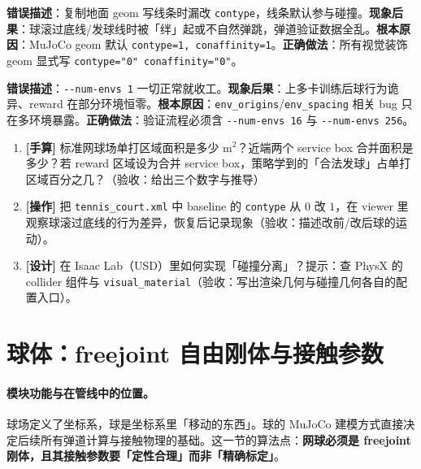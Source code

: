 \begin{pitfall}
\textbf{错误描述}：复制地面 geom 写线条时漏改 \verb|contype|，线条默认参与碰撞。\textbf{现象后果}：球滚过底线/发球线时被「绊」起或不自然弹跳，弹道验证数据全乱。\textbf{根本原因}：MuJoCo geom 默认 \verb|contype=1, conaffinity=1|。\textbf{正确做法}：所有视觉装饰 geom 显式写 \verb|contype="0" conaffinity="0"|。
\end{pitfall}

\begin{pitfall}[只在单环境下验证物理]
\textbf{错误描述}：\verb|--num-envs 1| 一切正常就收工。\textbf{现象后果}：上多卡训练后球行为诡异、reward 在部分环境恒零。\textbf{根本原因}：\verb|env_origins|/\verb|env_spacing| 相关 bug 只在多环境暴露。\textbf{正确做法}：验证流程必须含 \verb|--num-envs 16| 与 \verb|--num-envs 256|。
\end{pitfall}

\begin{practice}[本节动手任务]
\begin{enumerate}
  \item \textbf{[手算]} 标准网球场单打区域面积是多少 $\mathrm{m}^2$？近端两个 service box 合并面积是多少？若 reward 区域设为合并 service box，策略学到的「合法发球」占单打区域百分之几？（验收：给出三个数字与推导）
  \item \textbf{[操作]} 把 \verb|tennis_court.xml| 中 baseline 的 \verb|contype| 从 $0$ 改 $1$，在 viewer 里观察球滚过底线的行为差异，恢复后记录现象（验收：描述改前/改后球的运动）。
  \item \textbf{[设计]} 在 Isaac Lab（USD）里如何实现「碰撞分离」？提示：查 PhysX 的 collider 组件与 \verb|visual_material|（验收：写出渲染几何与碰撞几何各自的配置入口）。
\end{enumerate}
\end{practice}

\section{球体：freejoint 自由刚体与接触参数}
\label{sec:rlmc-tennis-ball}

\paragraph{模块功能与在管线中的位置。}球场定义了坐标系，球是坐标系里「移动的东西」。球的 MuJoCo 建模方式直接决定后续所有弹道计算与接触物理的基础。这一节的算法点：\textbf{网球必须是 freejoint 刚体，且其接触参数要「定性合理」而非「精确标定」}。

